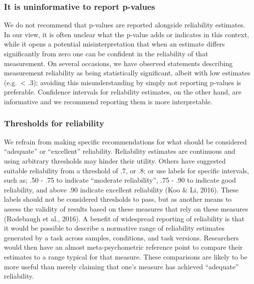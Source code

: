 \documentclass[english,,man,floatsintext]{apa6}
\begin{document}
\hypertarget{it-is-uninformative-to-report-p-values}{%
\subsubsection{It is uninformative to report p-values}\label{it-is-uninformative-to-report-p-values}}

We do not recommend that p-values are reported alongside reliability estimates. In our view, it is often unclear what the p-value adds or indicates in this context, while it opens a potential misinterpretation that when an estimate differs significantly from zero one can be confident in the reliability of that measurement. On several occasions, we have observed statements describing measurement reliability as being statistically significant, albeit with low estimates (e.g.~\textless{} .3); avoiding this misunderstanding by simply not reporting p-values is preferable. Confidence intervals for reliability estimates, on the other hand, are informative and we recommend reporting them is more interpretable.

\hypertarget{thresholds-for-reliability}{%
\subsubsection{Thresholds for reliability}\label{thresholds-for-reliability}}

We refrain from making specific recommendations for what should be considered \enquote{adequate} or \enquote{excellent} reliability. Reliability estimates are continuous and using arbitrary thresholds may hinder their utility. Others have suggested suitable reliability from a threshold of .7, or .8; or use labels for specific intervals, such as; .50 - .75 to indicate \enquote{moderate reliability}, .75 - .90 to indicate good reliability, and above .90 indicate excellent reliability (Koo \& Li, 2016). These labels should not be considered thresholds to pass, but as another means to assess the validity of results based on these measures that rely on these measures (Rodebaugh et al., 2016). A benefit of widespread reporting of reliability is that it would be possible to describe a normative range of reliability estimates generated by a task across samples, conditions, and task versions. Researchers would then have an almost meta-psychometric reference point to compare their estimates to a range typical for that measure. These comparisons are likely to be more useful than merely claiming that one's measure has achieved \enquote{adequate} reliability.
\end{document}
